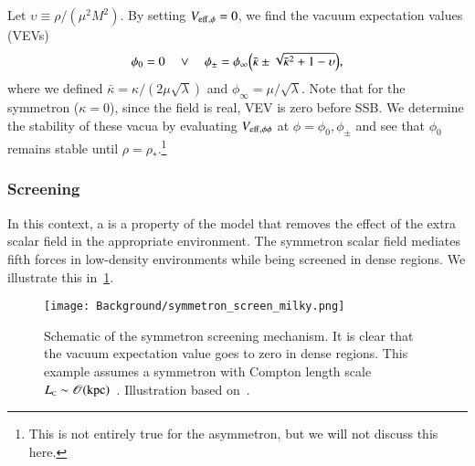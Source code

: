 


    Let $\upsilon\equiv\rho/(\mu^2M^2)$. By setting $V_\mathrm{eff,\phi}=0$, we find the vacuum expectation values (VEVs)
    \begin{equation}
        \phi_0 = 0 \quad \lor \quad \phi_\pm = \phi_\infty \pclosed{\bar{\kappa} \pm  \sqrt{\bar{\kappa}^2 +  1- \upsilon }},%
    \end{equation}
    where we defined $\bar{\kappa} = \kappa / (2\mu \sqrt{\lambda}) $ and $\phi_\infty = \mu/\sqrt{\lambda}$. Note that for the symmetron ($\kappa=0$), since the field is real, VEV is zero before SSB. We determine the stability of these vacua by evaluating $V_\mathrm{eff,\phi\phi}$ at $\phi=\phi_0,\phi_\pm$ and see that $\phi_0$ remains stable until $\rho=\rho_\ast$.\footnote{This is not entirely true for the asymmetron, but we will not discuss this here.}


    \subsubsection{Screening}
    In this context, a  is a property of the model that removes the effect of the extra scalar field in the appropriate environment. The symmetron scalar field mediates fifth forces in low-density environments while being screened in dense regions. We illustrate this in~\cref{fig:cosmo:quintessence:symmetron_screen_milky}. 

    \begin{figure}[h]
        \centering
        {\texttt{[image: Background/symmetron\_screen\_milky.png]}}
        {\caption{Schematic of the symmetron screening mechanism. It is clear that the vacuum expectation value goes to zero in dense regions. This example assumes a symmetron with Compton length scale $L_{\text{\tiny{C}}}\sim\mathscr{O}(\mathrm{kpc})$~\citep{burrageAccurateComputationScreening2024}. Illustration based on~\citet{christiansenCosmologicalSimulationsPhase2024}.}
        \label{fig:cosmo:quintessence:symmetron_screen_milky}}
    \end{figure}

